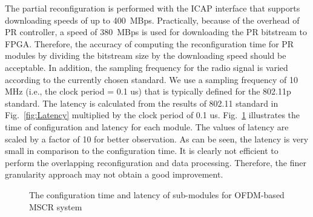 The partial reconfiguration is performed with the ICAP interface that supports downloading speeds of up to 400~MBps. 
Practically, because of the overhead of PR controller, a speed of 380~MBps is used for downloading the PR bitstream to FPGA.
Therefore, the accuracy of computing the reconfiguration time for PR modules by dividing the bitstream size by the downloading speed should be acceptable.
In addition, the sampling frequency for the radio signal is varied according to the currently chosen standard. 
We use a sampling frequency of 10 MHz (i.e., the clock period = 0.1 us) that is typically defined for the 802.11p standard.
The latency is calculated from the results of 802.11 standard in Fig.~\ref{fig:Latency} multiplied by the clock period of 0.1 us.
Fig.~\ref{fig:CfgLat} illustrates the time of configuration and latency for each module. 
The values of latency are scaled by a factor of 10 for better observation. As can be seen, the latency is very small in comparison to the configuration time. 
It is clearly not efficient to perform the overlapping reconfiguration and data processing. Therefore, the finer granularity approach may not obtain a good improvement.
\begin{figure}
\centering
{}
\caption{The configuration time and latency of sub-modules for OFDM-based MSCR system}
\label{fig:CfgLat}
\end{figure}


